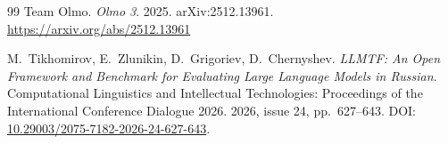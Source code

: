 \documentclass[12pt,a4paper]{article}
\begin{document}
\begin{thebibliography}{99}
Team Olmo.
\textit{Olmo 3}.
2025. arXiv:2512.13961.
\url{https://arxiv.org/abs/2512.13961}

M.~Tikhomirov, E.~Zlunikin, D.~Grigoriev, D.~Chernyshev.
\textit{LLMTF: An Open Framework and Benchmark for Evaluating Large Language Models in Russian}.
Computational Linguistics and Intellectual Technologies:
Proceedings of the International Conference Dialogue 2026.
2026, issue 24, pp.~627--643.
DOI: \href{https://doi.org/10.29003/2075-7182-2026-24-627-643}{10.29003/2075-7182-2026-24-627-643}.

\end{thebibliography}
\end{document}

